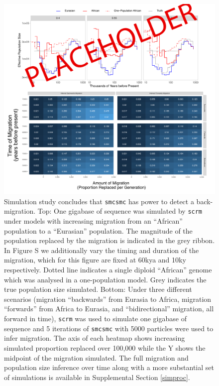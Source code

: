 \documentclass{article}
\begin{document}
\begin{figure}
	\centering
	\includegraphics[width=\textwidth]{../plot/ne/PLACEHOLDER_sims.pdf}
	\caption{Simulation study concludes that {\tt smcsmc} has power to detect a back-migration. Top: One gigabase of sequence was simulated by {\tt scrm} under models with increasing migration from an ``African'' population to a ``Eurasian'' population. The magnitude of the population replaced by the migration is indicated in the grey ribbon. In Figure S we additionally vary the timing and duration of the migration, which for this figure are fixed at 60kya and 10ky respectively. Dotted line indicates a single diploid ``African'' genome which was analysed in a one-population model. Grey indicates the true population size simulated. Bottom: Under three different scenarios (migration ``backwards'' from Eurasia to Africa, migration ``forwards'' from Africa to Eurasia, and ``bidirectional'' migration, all forward in time), {\tt scrm} was used to simulate one gigabase of sequence and 5 iterations of {\tt smcsmc} with 5000 particles were used to infer migration. The axis of each heatmap shows increasing simulated proportion replaced over 100,000 while the Y shows the midpoint of the migration simulated. The full migration and population size inference over time along with a more substantial set of simulations is available in Supplemental Section \ref{simproc}.}
	\label{sim}
\end{figure}
\end{document}
